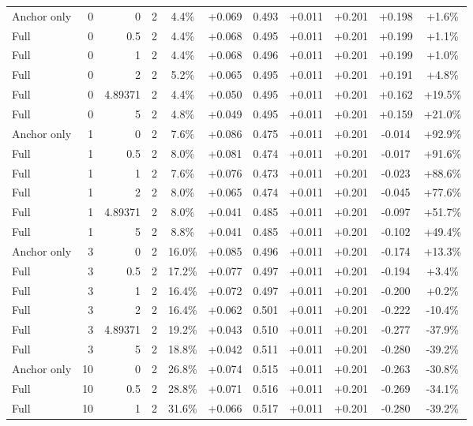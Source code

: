 \begin{table}[htbp]
\begin{tabular}{lrrrccccccc}
Anchor only & 0 & 0 & 2 & 4.4\% & +0.069 & 0.493 & +0.011 & +0.201 & +0.198 & +1.6\% \\
Full & 0 & 0.5 & 2 & 4.4\% & +0.068 & 0.495 & +0.011 & +0.201 & +0.199 & +1.1\% \\
Full & 0 & 1 & 2 & 4.4\% & +0.068 & 0.496 & +0.011 & +0.201 & +0.199 & +1.0\% \\
Full & 0 & 2 & 2 & 5.2\% & +0.065 & 0.495 & +0.011 & +0.201 & +0.191 & +4.8\% \\
Full & 0 & 4.89371 & 2 & 4.4\% & +0.050 & 0.495 & +0.011 & +0.201 & +0.162 & +19.5\% \\
Full & 0 & 5 & 2 & 4.8\% & +0.049 & 0.495 & +0.011 & +0.201 & +0.159 & +21.0\% \\
Anchor only & 1 & 0 & 2 & 7.6\% & +0.086 & 0.475 & +0.011 & +0.201 & -0.014 & +92.9\% \\
Full & 1 & 0.5 & 2 & 8.0\% & +0.081 & 0.474 & +0.011 & +0.201 & -0.017 & +91.6\% \\
Full & 1 & 1 & 2 & 7.6\% & +0.076 & 0.473 & +0.011 & +0.201 & -0.023 & +88.6\% \\
Full & 1 & 2 & 2 & 8.0\% & +0.065 & 0.474 & +0.011 & +0.201 & -0.045 & +77.6\% \\
Full & 1 & 4.89371 & 2 & 8.0\% & +0.041 & 0.485 & +0.011 & +0.201 & -0.097 & +51.7\% \\
Full & 1 & 5 & 2 & 8.8\% & +0.041 & 0.485 & +0.011 & +0.201 & -0.102 & +49.4\% \\
Anchor only & 3 & 0 & 2 & 16.0\% & +0.085 & 0.496 & +0.011 & +0.201 & -0.174 & +13.3\% \\
Full & 3 & 0.5 & 2 & 17.2\% & +0.077 & 0.497 & +0.011 & +0.201 & -0.194 & +3.4\% \\
Full & 3 & 1 & 2 & 16.4\% & +0.072 & 0.497 & +0.011 & +0.201 & -0.200 & +0.2\% \\
Full & 3 & 2 & 2 & 16.4\% & +0.062 & 0.501 & +0.011 & +0.201 & -0.222 & -10.4\% \\
Full & 3 & 4.89371 & 2 & 19.2\% & +0.043 & 0.510 & +0.011 & +0.201 & -0.277 & -37.9\% \\
Full & 3 & 5 & 2 & 18.8\% & +0.042 & 0.511 & +0.011 & +0.201 & -0.280 & -39.2\% \\
Anchor only & 10 & 0 & 2 & 26.8\% & +0.074 & 0.515 & +0.011 & +0.201 & -0.263 & -30.8\% \\
Full & 10 & 0.5 & 2 & 28.8\% & +0.071 & 0.516 & +0.011 & +0.201 & -0.269 & -34.1\% \\
Full & 10 & 1 & 2 & 31.6\% & +0.066 & 0.517 & +0.011 & +0.201 & -0.280 & -39.2\% \\

\end{tabular}
\end{table}
